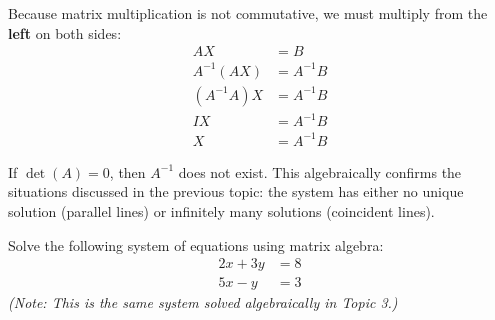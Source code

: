 Because matrix multiplication is not commutative, we must multiply from the \textbf{left} on both sides:
\begin{align*}
AX &= B \\
A^{-1} (AX) &= A^{-1} B \\
(A^{-1} A) X &= A^{-1} B \\
I X &= A^{-1} B \\
X &= A^{-1} B
\end{align*}

If $\det(A) = 0$, then $A^{-1}$ does not exist. This algebraically confirms the situations discussed in the previous topic: the system has either no unique solution (parallel lines) or infinitely many solutions (coincident lines).

\bigskip

\begin{problem}
Solve the following system of equations using matrix algebra:
\begin{align*}
2x + 3y &= 8 \\
5x - y &= 3
\end{align*}
\emph{(Note: This is the same system solved algebraically in Topic 3.)}
\end{problem}

